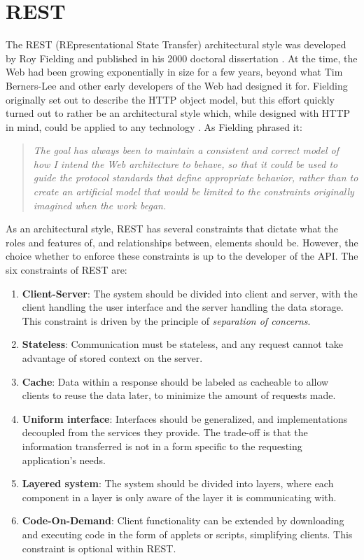 \section{REST} \label{sec:rest}
The REST (REpresentational State Transfer) architectural style was developed by Roy Fielding and published in his 2000 doctoral dissertation \cite{fielding2000architectural}. At the time, the Web had been growing exponentially in size for a few years, beyond what Tim Berners-Lee and other early developers of the Web had designed it for. Fielding originally set out to describe the HTTP object model, but this effort quickly turned out to rather be an architectural style which, while designed with HTTP in mind, could be applied to any technology \cite{fielding2017reflections}. As Fielding phrased it:
\begin{quote}
\textit{
The goal has always been to maintain a consistent and correct model of how I intend the Web architecture to behave, so that it could be used to guide the protocol standards that define appropriate behavior, rather than to create an artificial model that would be limited to the constraints originally imagined when the work began. \cite{fielding2000architectural}}
\end{quote}
As an architectural style, REST has several constraints that dictate what the roles and features of, and relationships between, elements should be. However, the choice whether to enforce these constraints is up to the developer of the API. The six constraints of REST are:
\begin{enumerate}
    \item \textbf{Client-Server}: The system should be divided into client and server, with the client handling the user interface and the server handling the data storage. This constraint is driven by the principle of \textit{separation of concerns}.
    \item \textbf{Stateless}: Communication must be stateless, and any request cannot take advantage of stored context on the server.
    \item \textbf{Cache}: Data within a response should be labeled as cacheable to allow clients to reuse the data later, to minimize the amount of requests made.
    \item \textbf{Uniform interface}: Interfaces should be generalized, and implementations decoupled from the services they provide. The trade-off is that the information transferred is not in a form specific to the requesting application's needs.
    \item \textbf{Layered system}: The system should be divided into layers, where each component in a layer is only aware of the layer it is communicating with.
    \item \textbf{Code-On-Demand}: Client functionality can be extended by downloading and executing code in the form of applets or scripts, simplifying clients. This constraint is optional within REST.
\end{enumerate}

